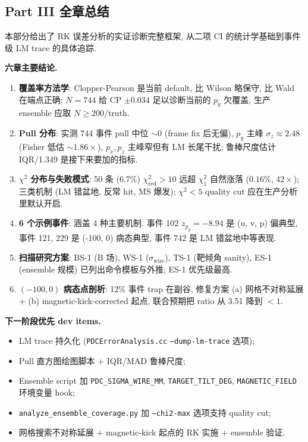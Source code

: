 
\subsection*{Part III 全章总结}

本部分给出了 RK 误差分析的实证诊断完整框架, 从二项 CI 的统计学基础到事件级 LM trace 的具体追踪.

\textbf{六章主要结论.}
\begin{enumerate}[label=\arabic*., nosep]
  \item \textbf{覆盖率方法学}: Clopper-Pearson 是当前 default, 比 Wilson 略保守, 比 Wald 在端点正确; $N=744$ 给 CP $\pm 0.034$ 足以诊断当前的 $p_y$ 欠覆盖, 生产 ensemble 应取 $N \ge 200$/truth.
  \item \textbf{Pull 分布}: 实测 744 事件 pull 中位 $\sim 0$ (frame fix 后无偏), $p_y$ 主峰 $\sigma_z \approx 2.48$ (Fisher 低估 $\sim 1.86\times$), $p_x, p_z$ 主峰窄但有 LM 长尾干扰; 鲁棒尺度估计 IQR/1.349 是接下来要加的指标.
  \item \textbf{$\chi^2$ 分布与失败模式}: 50 条 ($6.7\%$) $\chi^2_{\mathrm{red}} > 10$ 远超 $\chi^2_1$ 自然涨落 ($0.16\%$, $42\times$); 三类机制 (LM 错盆地, 反常 hit, MS 爆发); $\chi^2 < 5$ quality cut 应在生产分析里默认开启.
  \item \textbf{6 个示例事件}: 涵盖 4 种主要机制. 事件 102 $z_{p_y} = -8.94$ 是 (u, v, p) 偏典型, 事件 121, 229 是 (-100, 0) 病态典型, 事件 742 是 LM 错盆地中等表现.
  \item \textbf{扫描研究方案}: BS-1 (B 场), WS-1 ($\sigma_{\mathrm{wire}}$), TS-1 (靶倾角 sanity), ES-1 (ensemble 规模) 已列出命令模板与外推; ES-1 优先级最高.
  \item \textbf{$(-100, 0)$ 病态点剖析}: 12\% 事件 trap 在副谷, 修复方案 (a) 网格不对称延展 + (b) magnetic-kick-corrected 起点, 联合预期把 ratio 从 3.51 降到 $< 1$.
\end{enumerate}

\textbf{下一阶段优先 dev items.}
\begin{itemize}[nosep]
  \item LM trace 持久化 (\texttt{PDCErrorAnalysis.cc} \texttt{--dump-lm-trace} 选项);
  \item Pull 直方图绘图脚本 + IQR/MAD 鲁棒尺度;
  \item Ensemble script 加 \texttt{PDC\_SIGMA\_WIRE\_MM}, \texttt{TARGET\_TILT\_DEG}, \texttt{MAGNETIC\_FIELD} 环境变量 hook;
  \item \texttt{analyze\_ensemble\_coverage.py} 加 \texttt{--chi2-max} 选项支持 quality cut;
  \item 网格搜索不对称延展 + magnetic-kick 起点的 RK 实施 + ensemble 验证.
\end{itemize}

